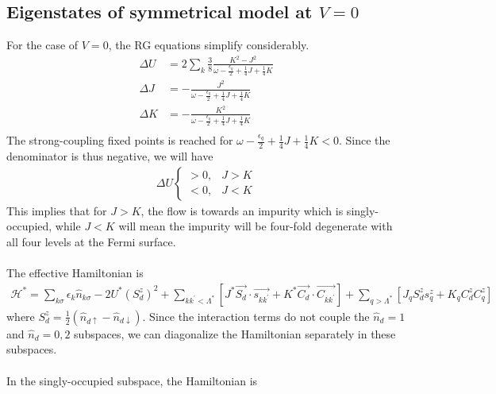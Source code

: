 \documentclass[twoside]{report}
\numberwithin{equation}{section}
\begin{document}
\subsection{Eigenstates of symmetrical model at \(V=0\)}
For the case of \(V=0\), the RG equations simplify considerably.
\begin{equation}\begin{aligned}
	\Delta U &= 2\sum_k \frac{3}{8}\frac{K^2 - J^2}{\omega - \frac{\epsilon_q}{2} + \frac{1}{4}J + \frac{1}{4}K} \\
	\Delta J &= - \frac{J^2}{\omega - \frac{\epsilon_q}{2} + \frac{1}{4}J + \frac{1}{4}K}\\
	\Delta K &= - \frac{K^2}{\omega - \frac{\epsilon_q}{2} + \frac{1}{4}J + \frac{1}{4}K}\\
\end{aligned}\end{equation}
The strong-coupling fixed points is reached for \(\omega - \frac{\epsilon_q}{2} + \frac{1}{4}J + \frac{1}{4}K < 0\). Since the denominator is thus negative, we will have
\begin{equation}\begin{aligned}
	\Delta U \begin{cases}
		> 0, & J> K \\
		< 0, & J< K
	\end{cases}
\end{aligned}\end{equation}
This implies that for \(J>K\), the flow is towards an impurity which is singly-occupied, while \(J < K\) will mean the impurity will be four-fold degenerate with all four levels at the Fermi surface. 
\\\\The effective Hamiltonian is
\begin{equation}\begin{aligned}
	\mathcal{H}^* = \sum_{k\sigma} \epsilon_k \hat n_{k\sigma} - 2 U^* \left(S_d^z\right)^2 + \sum_{kk^\prime < \Lambda^*}\left[J^* \vec{S_d}\cdot\vec{s_{kk^\prime}} + K^* \vec{C_d}\cdot\vec{C_{kk^\prime}}\right] + \sum_{q > \Lambda^*}\left[J_q S_d^z s^z_{q} + K_q C_d^z C^z_{q}\right]
\end{aligned}\end{equation}
where \(S_d^z = \frac{1}{2}\left( \hat n_{d\uparrow} - \hat n_{d \downarrow} \right) \). Since the interaction terms do not couple the \(\hat n_{d}=1\) and \(\hat n_{d}=0,2\) subspaces, we can diagonalize the Hamiltonian separately in these subspaces. 
\\\\In the singly-occupied subspace, the Hamiltonian is
\end{document}
